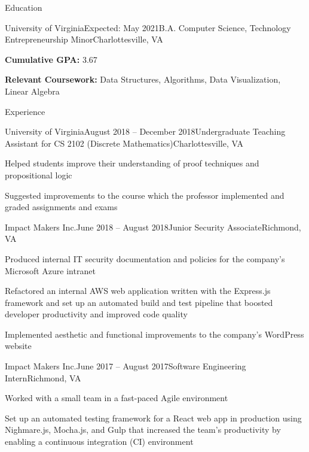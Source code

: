 \documentclass{resume}
\begin{document}
\begin{rSection}{Education}

  \begin{rSubsection}{University of Virginia}{Expected: May 2021}{B.A. Computer Science, Technology Entrepreneurship Minor}{Charlottesville, VA}
    \item \textbf{Cumulative GPA:} 3.67
    \item \textbf{Relevant Coursework:} Data Structures, Algorithms, Data Visualization, Linear Algebra
  \end{rSubsection}

\end{rSection}

\begin{rSection}{Experience}

  \begin{rSubsection}{University of Virginia}{August 2018 -- December 2018}{Undergraduate Teaching Assistant for CS 2102 (Discrete Mathematics)}{Charlottesville, VA}
    \item Helped students improve their understanding of proof techniques and propositional logic
    \item Suggested improvements to the course which the professor implemented and graded assignments and exams
  \end{rSubsection}

  \begin{rSubsection}{Impact Makers Inc.}{June 2018 -- August 2018}{Junior Security Associate}{Richmond, VA}
    \item Produced internal IT security documentation and policies for the company's Microsoft Azure intranet
    \item Refactored an internal AWS web application written with the Express.js framework and set up an automated build and test pipeline that boosted developer productivity and improved code quality
    \item Implemented aesthetic and functional improvements to the company's WordPress website
  \end{rSubsection}

  \begin{rSubsection}{Impact Makers Inc.}{June 2017 -- August 2017}{Software Engineering Intern}{Richmond, VA}
    \item Worked with a small team in a fast-paced Agile environment
    \item Set up an automated testing framework for a React web app in production using Nighmare.js, Mocha.js, and Gulp that increased the team's productivity by enabling a continuous integration (CI) environment
  \end{rSubsection}

\end{rSection}
\end{document}
